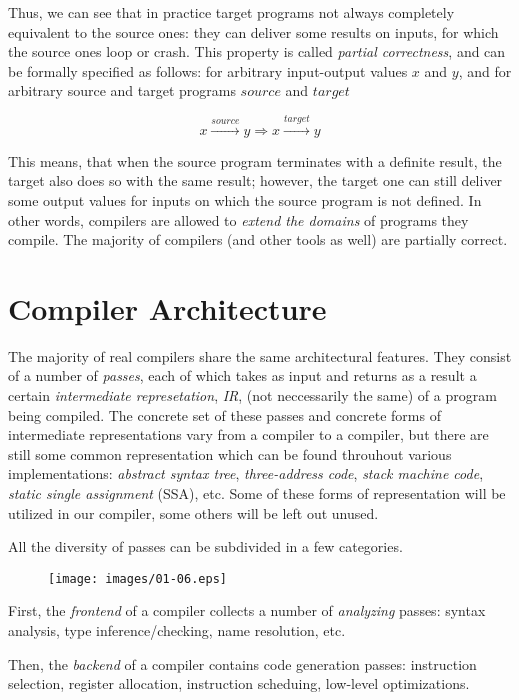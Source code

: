 Thus, we can see that in practice target programs not always completely equivalent to the source ones: they can deliver some results on inputs, for which the source
ones loop or crash. This property is called \emph{partial correctness}, and can be formally specified as follows: for arbitrary input-output values $x$ and $y$, and for
arbitrary source and target programs $source$ and $target$

\[
x\xrightarrow{\displaystyle{source}}y \Longrightarrow x\xrightarrow{\displaystyle{target}}y
\]

This means, that when the source program terminates with a definite result, the target also does so with the same result; however, the target one can still deliver some output
values for inputs on which the source program is not defined. In other words, compilers are allowed to \emph{extend the domains} of programs they compile. The
majority of compilers (and other tools as well) are partially correct.

\section{Compiler Architecture}

The majority of real compilers share the same architectural features. They consist of a number of \emph{passes}, each of which
takes as input and returns as a result a certain \emph{intermediate represetation}, \emph{IR}, (not neccessarily the same) of a program
being compiled. The concrete set of these passes and concrete forms of intermediate representations vary from a compiler to a compiler,
but there are still some common representation which can be found throuhout various implementations: \emph{abstract syntax tree},
\emph{three-address code}, \emph{stack machine code}, \emph{static single assignment} (SSA), etc. Some of these forms of representation
will be utilized in our compiler, some others will be left out unused.

All the diversity of passes can be subdivided in a few categories.

\begin{figure}[h]
  \centering
  \texttt{[image: images/01-06.eps]}
\end{figure}

First, the \emph{frontend} of a compiler collects a number of \emph{analyzing} passes: syntax analysis, type inference/checking,
name resolution, etc.

Then, the \emph{backend} of a compiler contains code generation passes: instruction selection, register allocation,
instruction scheduing, low-level optimizations.


